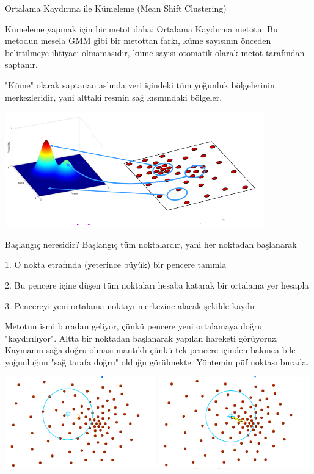 \documentclass[12pt,fleqn]{article}\usepackage{../../common}
\begin{document}
Ortalama Kaydırma ile Kümeleme (Mean Shift Clustering)

Kümeleme yapmak için bir metot daha: Ortalama Kaydırma metotu. Bu metodun
mesela GMM gibi bir metottan farkı, küme sayısının önceden belirtilmeye
ihtiyacı olmamasıdır, küme sayısı otomatik olarak metot tarafından
saptanır.

"Küme" olarak saptanan aslında veri içindeki tüm yoğunluk bölgelerinin
merkezleridir, yani alttaki resmin sağ kısmındaki bölgeler.

\includegraphics[height=5cm]{dist.png}

Başlangıç neresidir? Başlangıç tüm noktalardır, yani her noktadan
başlanarak

1. O nokta etrafında (yeterince büyük) bir pencere tanımla

2. Bu pencere içine düşen tüm noktaları hesaba katarak bir ortalama yer hesapla

3. Pencereyi yeni ortalama noktayı merkezine alacak şekilde kaydır

Metotun ismi buradan geliyor, çünkü pencere yeni ortalamaya doğru
"kaydırılıyor". Altta bir noktadan başlanarak yapılan hareketi
görüyoruz.  Kaymanın sağa doğru olması mantıklı çünkü tek pencere
içinden bakınca bile yoğunluğun "sağ tarafa doğru" olduğu
görülmekte. Yöntemin püf noktası burada.

\includegraphics[height=4cm]{mean_2.png}
\includegraphics[height=4cm]{mean_3.png}
\end{document}
